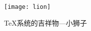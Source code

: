 \documentclass[a4paper, oneside]{ctexart}
\begin{document}
	\begin{figure}[htbp]	%
		\centering	%
		\texttt{[image: lion]}
		\caption{\TeX 系统的吉祥物---小狮子}	%
	\end{figure}
\end{document}
